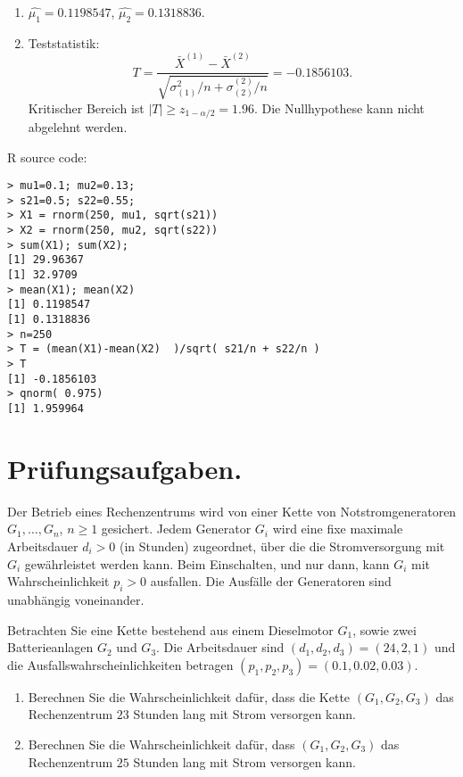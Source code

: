\solution
\begin{enumerate}
    \item $\hat{\mu_1} = 0.1198547$, $\hat{\mu_2} = 0.1318836$.
    \item Teststatistik:
        \begin{equation*}
            T = \frac{ \bar X^{(1)} - \bar X^{(2)}}{ \sqrt{ \sigma^{2}_{(1)}/n + \sigma^{(2)}_{(2)}/n }} = -0.1856103.
        \end{equation*}
        Kritischer Bereich ist $| T | \geq z_{1-\alpha/2} = 1.96$. Die
        Nullhypothese kann nicht abgelehnt werden.
\end{enumerate}
R source code:
\begin{lstlisting}
> mu1=0.1; mu2=0.13; 
> s21=0.5; s22=0.55;
> X1 = rnorm(250, mu1, sqrt(s21))
> X2 = rnorm(250, mu2, sqrt(s22))
> sum(X1); sum(X2);
[1] 29.96367
[1] 32.9709
> mean(X1); mean(X2)
[1] 0.1198547
[1] 0.1318836
> n=250
> T = (mean(X1)-mean(X2)  )/sqrt( s21/n + s22/n )
> T
[1] -0.1856103
> qnorm( 0.975)
[1] 1.959964
\end{lstlisting}



\section{Prüfungsaufgaben.}

Der Betrieb eines Rechenzentrums wird von einer Kette von Notstromgeneratoren
$G_1,\dots ,G_n$, $n\geq 1$ gesichert. Jedem Generator $G_i$ wird eine fixe
maximale Arbeitsdauer $d_{i}>0$ (in Stunden) zugeordnet, über die die
Stromversorgung mit $G_i$ gewährleistet werden kann. Beim Einschalten, und nur
dann, kann $G_i$ mit Wahrscheinlichkeit $p_{i}>0$ ausfallen. Die Ausfälle der
Generatoren sind unabhängig voneinander.

Betrachten Sie eine Kette bestehend aus einem Dieselmotor $G_1$,
sowie zwei Batterieanlagen $G_2$ und $G_3$. Die Arbeitsdauer sind
$\left( d_1, d_2, d_3 \right) = \left( 24, 2, 1 \right)$ und die
Ausfallswahrscheinlichkeiten betragen $\left( p_{1}, p_{2}, p_{3}
\right) = \left( 0.1, 0.02, 0.03 \right)$.

\begin{enumerate}
    \item Berechnen Sie die Wahrscheinlichkeit dafür, dass die Kette
        $\left( G_1, G_2, G_3 \right)$ das Rechenzentrum $23$ Stunden lang
        mit Strom versorgen kann.

    \item Berechnen Sie die Wahrscheinlichkeit dafür, dass $\left( G_1, G_2,
        G_3 \right)$ das Rechenzentrum $25$ Stunden lang mit Strom versorgen
        kann.
\end{enumerate}

